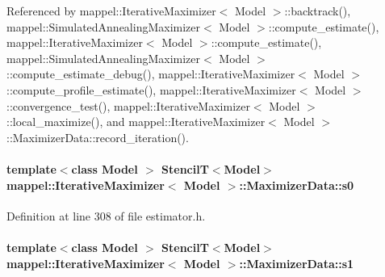Referenced by mappel\+::\+Iterative\+Maximizer$<$ Model $>$\+::backtrack(), mappel\+::\+Simulated\+Annealing\+Maximizer$<$ Model $>$\+::compute\+\_\+estimate(), mappel\+::\+Iterative\+Maximizer$<$ Model $>$\+::compute\+\_\+estimate(), mappel\+::\+Simulated\+Annealing\+Maximizer$<$ Model $>$\+::compute\+\_\+estimate\+\_\+debug(), mappel\+::\+Iterative\+Maximizer$<$ Model $>$\+::compute\+\_\+profile\+\_\+estimate(), mappel\+::\+Iterative\+Maximizer$<$ Model $>$\+::convergence\+\_\+test(), mappel\+::\+Iterative\+Maximizer$<$ Model $>$\+::local\+\_\+maximize(), and mappel\+::\+Iterative\+Maximizer$<$ Model $>$\+::\+Maximizer\+Data\+::record\+\_\+iteration().

\paragraph[{\texorpdfstring{s0}{s0}}]{\setlength{\rightskip}{0pt plus 5cm}template$<$class Model $>$ {\bf StencilT}$<$Model$>$ {\bf mappel\+::\+Iterative\+Maximizer}$<$ Model $>$\+::Maximizer\+Data\+::s0\hspace{0.3cm}{\ttfamily [protected]}}\hypertarget{classmappel_1_1IterativeMaximizer_1_1MaximizerData_a1a3b8f9693e769eded9fe76751fa49c1}{}\label{classmappel_1_1IterativeMaximizer_1_1MaximizerData_a1a3b8f9693e769eded9fe76751fa49c1}


Definition at line 308 of file estimator.\+h.

\paragraph[{\texorpdfstring{s1}{s1}}]{\setlength{\rightskip}{0pt plus 5cm}template$<$class Model $>$ {\bf StencilT}$<$Model$>$ {\bf mappel\+::\+Iterative\+Maximizer}$<$ Model $>$\+::Maximizer\+Data\+::s1\hspace{0.3cm}{\ttfamily [protected]}}\hypertarget{classmappel_1_1IterativeMaximizer_1_1MaximizerData_a3c0f6ec4ba531dfefe8e4b73f537192d}{}\label{classmappel_1_1IterativeMaximizer_1_1MaximizerData_a3c0f6ec4ba531dfefe8e4b73f537192d}


